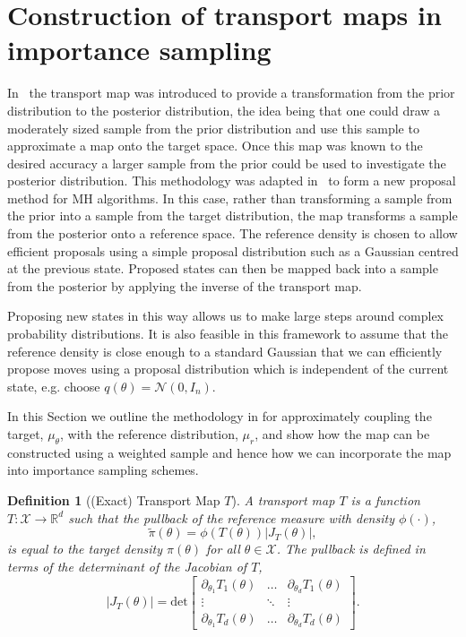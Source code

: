 \documentclass[final]{siamltex}
\newtheorem{dfn}{Definition}[section]
\begin{document}
\section{Construction of transport maps in importance sampling} \label{sec:map}

In~\cite{el2012bayesian} the transport map was introduced to provide a transformation from the prior
distribution to the posterior distribution, the idea being that one could draw a moderately sized
sample from the prior distribution and use this sample to approximate a map onto the target space.
Once this map was known to the desired accuracy a larger sample from the prior could be used to
investigate the posterior distribution. This
methodology was adapted in~\cite{parno2014transport} to form a new proposal method for MH
algorithms. In this case, rather than transforming a sample from the prior into a sample from the target
distribution, the map transforms a sample from the posterior onto a reference space.
The reference density is chosen to allow efficient proposals using a simple proposal
distribution such as a Gaussian centred at the previous state. Proposed states can then be mapped back into a sample from the posterior by applying the inverse of the transport map.

Proposing new states in this way allows us to make large steps around complex probability distributions.
It is also feasible in this framework to assume that the reference density is close enough to a standard Gaussian that we can efficiently propose moves using a proposal distribution which is independent of the current state, e.g. choose $q(\theta) = \mathcal{N}(0,I_n)$.

In this Section we outline the methodology in
\cite{parno2014transport} for approximately coupling the target,
$\mu_{\theta}$, with the reference distribution, $\mu_r$, and
show how the map can be constructed using a weighted sample
and hence how we can incorporate the map into importance sampling schemes.

\begin{dfn}[(Exact) Transport Map $T$]
	A transport map $T$ is a function $T\colon
        \mathcal{X}\rightarrow\mathbb{R}^d$ such that the {\it
          pullback} of the reference measure with density $\phi(\cdot)$,
	\begin{equation}\label{eq:pullback}
		\tilde{\pi}(\theta) = \phi(T(\theta))|J_T(\theta)|,
	\end{equation}
	is equal to the target density $\pi(\theta)$ for all $\theta \in \mathcal{X}$. The pullback is defined in terms of the determinant of the Jacobian of $T$,
	\[
		|J_T(\theta)| = \text{det}\begin{bmatrix} \partial_{\theta_1} T_1(\theta) & \dots & \partial_{\theta_d} T_1(\theta) \\ \vdots & \ddots & \vdots \\ \partial_{\theta_1} T_d(\theta) & \dots & \partial_{\theta_d} T_d(\theta) \end{bmatrix}.
	\]
\end{dfn}
\end{document}

